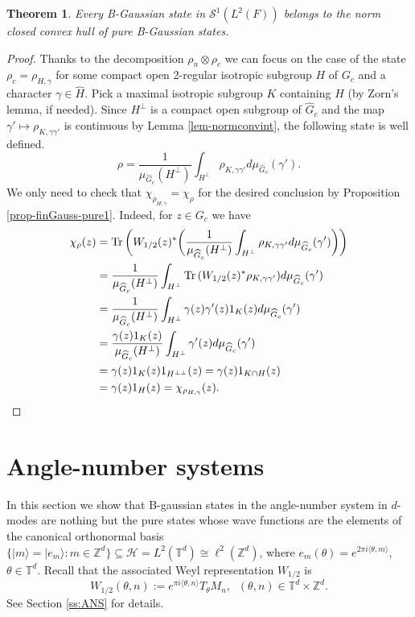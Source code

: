 \documentclass[12pt,reqno]{amsart}
\newtheorem{thm}{Theorem}
\theoremstyle{definition}
\theoremstyle{definition}
\theoremstyle{definition}
\numberwithin{thm}{section}
\numberwithin{equation}{section}
\newcommand{\la}{\langle}
\newcommand{\ra}{\rangle}
\newcommand{\Hi}{\mathcal{H}}
\newcommand{\tor}{\mathbb{T}}
\newcommand{\z}{\mathbb{Z}}
\newcommand{\mc}[1]{\mathcal #1}
\newcommand{\tr}{{\rm Tr}\,}
\newcommand{\ten}{\otimes}
\newcommand{\wh}[1]{\widehat{#1}}
\begin{document}
\begin{thm}
Every B-Gaussian state in $\mc{S}^1(L^2(F))$ belongs to the norm closed convex hull of pure B-Gaussian states.
\end{thm}
\begin{proof}
Thanks to the decomposition $\rho_n\ten \rho_c$ we can focus on the case of the state $\rho_c = \rho_{H,\gamma}$ for some compact open 2-regular isotropic subgroup $H$ of $G_c$ and a character $\gamma \in \wh{H}$. Pick a maximal isotropic subgroup $K$ containing $H$ (by Zorn's lemma, if needed). %
Since $H^\perp$ is a compact open subgroup of $\wh{G}_c$ and the map $\gamma'\mapsto \rho_{K ,\gamma\gamma'}$ is continuous by Lemma \ref{lem-normconvint}, the following state is well defined.
    $$\rho = \frac{1}{\mu_{\wh{G}_c}(H^\perp)}\int_{H^\perp}\rho_{K ,\gamma\gamma'}d\mu_{\wh{G}_c}(\gamma').$$
We only need to check that $\chi_{\rho_{H,\gamma}} = \chi_\rho$ for the desired conclusion by Proposition \ref{prop-finGauss-pure1}. Indeed, for $z\in G_c$ we have
\begin{align*}
    \chi_\rho(z)&=\tr\bigg(W_{1/2}(z)^*\bigg(\frac{1}{\mu_{\wh{G}_c}(H^\perp)}\int_{H^\perp}\rho_{K ,\gamma\gamma'}d\mu_{\wh{G}_c}(\gamma')\bigg)\bigg)\\
    &=\frac{1}{\mu_{\wh{G}_c}(H^\perp)}\int_{H^\perp}\tr(W_{1/2}(z)^*\rho_{K ,\gamma\gamma'})d\mu_{\wh{G}_c}(\gamma')\\
    & = \frac{1}{\mu_{\wh{G}_c}(H^\perp)}\int_{H^\perp}\gamma(z)\gamma'(z) 1_{K}(z) d\mu_{\wh{G}_c}(\gamma')\\
    &=\frac{\gamma(z)1_{K}(z)}{\mu_{\wh{G}_c}(H^\perp)}\int_{H^\perp}\gamma'(z)d\mu_{\wh{G}_c}(\gamma')\\
    &=\gamma(z)1_{K }(z) 1_{H^{\perp\perp}}(z) = \gamma(z)1_{K \cap H}(z)\\
    &=\gamma(z)1_H(z) = \chi_{\rho_{H,\gamma}}(z).
\end{align*}
\end{proof}




\section{Angle-number systems}\label{sec-AN}

In this section we show that B-gaussian states in the angle-number system in $d$-modes are nothing but the pure states whose wave functions are the elements of the canonical orthonormal basis $\{ |m\ra = |e_m\ra : m\in \z^d\} \subseteq \Hi = L^2(\tor^d)\cong \ell^2(\z^d)$, where $e_m(\theta) = e^{2\pi i \la \theta, m\ra}$, $\theta \in \tor^d$. Recall that the associated Weyl representation $W_{1/2}$ is
    $$W_{1/2}(\theta,n):=e^{\pi i\la  \theta, n \ra}T_\theta M_n,\;\; (\theta,n)\in \tor^d\times \z^d.$$
See Section \ref{ss:ANS} for details.
\end{document}
